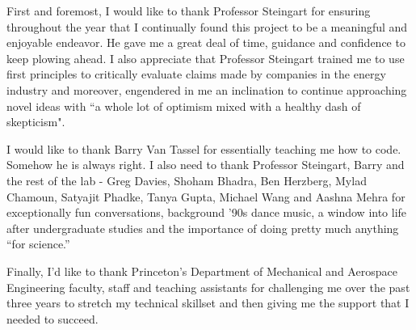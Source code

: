 
First and foremost, I would like to thank Professor Steingart for ensuring throughout the year that I continually found this project to be a meaningful and enjoyable endeavor. He gave me a great deal of time, guidance and confidence to keep plowing ahead. I also appreciate that Professor Steingart trained me to use first principles to critically evaluate claims made by companies in the energy industry and moreover, engendered in me an inclination to continue approaching novel ideas with ``a whole lot of optimism mixed with a healthy dash of skepticism".

I would like to thank Barry Van Tassel for essentially teaching me how to code. Somehow he is always right. I also need to thank Professor Steingart, Barry and the rest of the lab - Greg Davies, Shoham Bhadra, Ben Herzberg, Mylad Chamoun, Satyajit Phadke, Tanya Gupta, Michael Wang and Aashna Mehra for exceptionally fun conversations, background '90s dance music, a window into life after undergraduate studies and the importance of doing pretty much anything ``for science.''

Finally, I'd like to thank Princeton's Department of Mechanical and Aerospace Engineering faculty, staff and teaching assistants for challenging me over the past three years to stretch my technical skillset and then giving me the support that I needed to succeed.